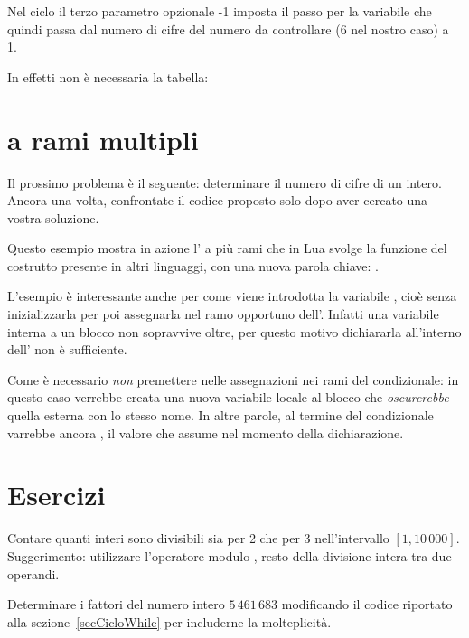 Nel ciclo  il terzo parametro opzionale -1 imposta il passo per la
variabile  che quindi passa dal numero di cifre del numero da
controllare (6 nel nostro caso) a 1.

In effetti non è necessaria la tabella:


\section{ a rami multipli}

Il prossimo problema è il seguente: determinare il numero di cifre di un
intero. Ancora una volta, confrontate il codice proposto solo dopo aver cercato
una vostra soluzione.

Questo esempio mostra in azione l' a più rami che in Lua svolge
la funzione del costrutto  presente in altri linguaggi, con una
nuova parola chiave: .

L'esempio è interessante anche per come viene introdotta la variabile
, cioè senza inizializzarla per poi assegnarla nel ramo opportuno
dell'. Infatti una variabile interna a un blocco non sopravvive oltre,
per questo motivo dichiararla all'interno dell' non è sufficiente.

Come è necessario \emph{non} premettere  nelle
assegnazioni nei rami del condizionale: in questo caso verrebbe creata una nuova
variabile locale al blocco che \emph{oscurerebbe} quella esterna con lo stesso
nome. In altre parole, al termine del condizionale  varrebbe ancora
, il valore che assume nel momento della dichiarazione.


\section{Esercizi}

\begin{Exercise}[label=cos-01]
Contare quanti interi sono divisibili sia per 2 che per 3 nell'intervallo \( [1,
10\,000]\). Suggerimento: utilizzare l'operatore modulo \key{\%}, resto della
divisione intera tra due operandi.
\end{Exercise}

\begin{Exercise}[label=cos-02]
Determinare i fattori del numero intero \(5\,461\,683\) modificando il codice
riportato alla sezione~\ref{secCicloWhile} per includerne la molteplicità.
\end{Exercise}

